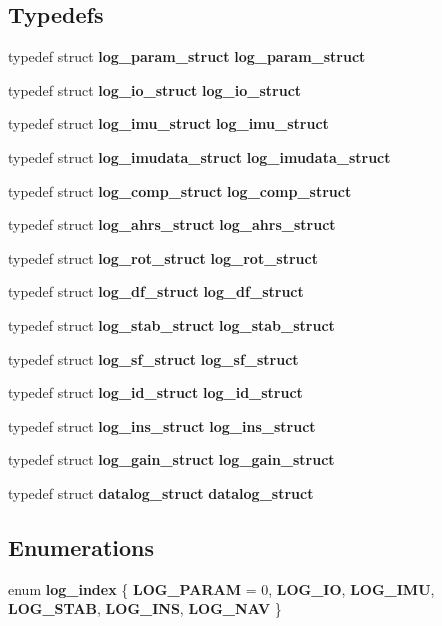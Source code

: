\subsection*{Typedefs}
\begin{DoxyCompactItemize}
\item 
typedef struct \textbf{ log\+\_\+param\+\_\+struct} \textbf{ log\+\_\+param\+\_\+struct}
\item 
typedef struct \textbf{ log\+\_\+io\+\_\+struct} \textbf{ log\+\_\+io\+\_\+struct}
\item 
typedef struct \textbf{ log\+\_\+imu\+\_\+struct} \textbf{ log\+\_\+imu\+\_\+struct}
\item 
typedef struct \textbf{ log\+\_\+imudata\+\_\+struct} \textbf{ log\+\_\+imudata\+\_\+struct}
\item 
typedef struct \textbf{ log\+\_\+comp\+\_\+struct} \textbf{ log\+\_\+comp\+\_\+struct}
\item 
typedef struct \textbf{ log\+\_\+ahrs\+\_\+struct} \textbf{ log\+\_\+ahrs\+\_\+struct}
\item 
typedef struct \textbf{ log\+\_\+rot\+\_\+struct} \textbf{ log\+\_\+rot\+\_\+struct}
\item 
typedef struct \textbf{ log\+\_\+df\+\_\+struct} \textbf{ log\+\_\+df\+\_\+struct}
\item 
typedef struct \textbf{ log\+\_\+stab\+\_\+struct} \textbf{ log\+\_\+stab\+\_\+struct}
\item 
typedef struct \textbf{ log\+\_\+sf\+\_\+struct} \textbf{ log\+\_\+sf\+\_\+struct}
\item 
typedef struct \textbf{ log\+\_\+id\+\_\+struct} \textbf{ log\+\_\+id\+\_\+struct}
\item 
typedef struct \textbf{ log\+\_\+ins\+\_\+struct} \textbf{ log\+\_\+ins\+\_\+struct}
\item 
typedef struct \textbf{ log\+\_\+gain\+\_\+struct} \textbf{ log\+\_\+gain\+\_\+struct}
\item 
typedef struct \textbf{ datalog\+\_\+struct} \textbf{ datalog\+\_\+struct}
\end{DoxyCompactItemize}
\subsection*{Enumerations}
\begin{DoxyCompactItemize}
\item 
enum \textbf{ log\+\_\+index} \{ \newline
\textbf{ L\+O\+G\+\_\+\+P\+A\+R\+AM} = 0, 
\textbf{ L\+O\+G\+\_\+\+IO}, 
\textbf{ L\+O\+G\+\_\+\+I\+MU}, 
\textbf{ L\+O\+G\+\_\+\+S\+T\+AB}, 
\newline
\textbf{ L\+O\+G\+\_\+\+I\+NS}, 
\textbf{ L\+O\+G\+\_\+\+N\+AV}
 \}
\end{DoxyCompactItemize}

